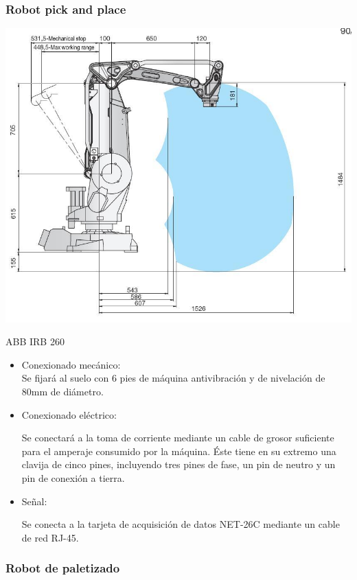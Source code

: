 \newpage

\subsubsection{Robot pick and place}

	\includegraphics[scale=0.3]{Datasheets/8Foto.jpg}
	
	ABB IRB 260
		\begin{itemize}
				\item{Conexionado mecánico:}\\
				
				Se fijará al suelo con 6 pies de máquina antivibración y de nivelación de 80mm de diámetro.

				\item{Conexionado eléctrico:}

				Se conectará a la toma de corriente mediante un cable de grosor suficiente para el amperaje consumido por la máquina. Éste tiene en su extremo una clavija de cinco pines, incluyendo tres pines de fase, un pin de neutro y un pin de conexión a tierra.  
				
				\item{Señal:}

				Se conecta a la tarjeta de acquisición de datos NET-26C mediante un cable de red RJ-45.
		\end{itemize}

\newpage

	\subsubsection{Robot de paletizado}

